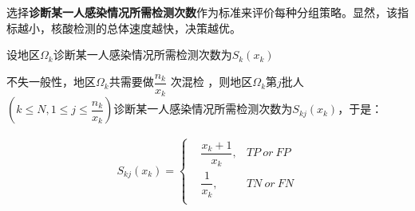 \documentclass[withoutpreface,bwprint]{cumcmthesis} %
\newcommand\MyBox[2]{
  \fbox{\lower0.75cm
    \vbox to 1.7cm{\vfil
      \hbox to 1.7cm{\hfil\parbox{1.4cm}{#1\\#2}\hfil}
      \vfil}%
  }%
}
\begin{document}

选择\textbf{诊断某一人感染情况所需检测次数}作为标准来评价每种分组策略。显然，该指标越小，核酸检测的总体速度越快，决策越优。

设地区$\Omega_k$诊断某一人感染情况所需检测次数为$S_{k}(x_k)$

不失一般性，地区$\Omega_k$共需要做$ \dfrac{n_k}{x_k}$ 次混检 ，则地区$\Omega_k$第$j$批人$(k\leqslant N,1 \leqslant j \leqslant \dfrac{n_k}{x_k})$诊断某一人感染情况所需检测次数为$S_{kj}(x_k)$，于是：

\begin{align}
\label{skj}
    S_{kj}(x_k)=\left\{
    \begin{aligned}
        &\dfrac{x_k+1}{x_k},&TP\: or\: FP\\
        &\dfrac{1}{x_k},&TN\: or\: FN\\
    \end{aligned}
    \right.
\end{align}
\end{document}
